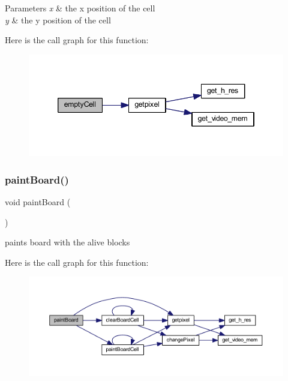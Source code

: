 \begin{DoxyParams}{Parameters}
{\em x} & the x position of the cell \\
\hline
{\em y} & the y position of the cell \\
\hline
\end{DoxyParams}
Here is the call graph for this function\+:
\nopagebreak
\begin{figure}[H]
\begin{center}
\leavevmode
\includegraphics[width=346pt]{group__board_gac7217ffded731ca5e0785e35b36c0191_cgraph}
\end{center}
\end{figure}
\mbox{\label{group__board_ga7f29585bdde7d843e71f9f2c80c8543a}} 
\subsubsection{\texorpdfstring{paintBoard()}{paintBoard()}}
{\footnotesize\ttfamily void paint\+Board (\begin{DoxyParamCaption}{ }\end{DoxyParamCaption})}



paints board with the alive blocks 

Here is the call graph for this function\+:
\nopagebreak
\begin{figure}[H]
\begin{center}
\leavevmode
\includegraphics[width=350pt]{group__board_ga7f29585bdde7d843e71f9f2c80c8543a_cgraph}
\end{center}
\end{figure}
\mbox{\label{group__board_gaca3eaa2f0cd1abf2f8cb0e6d80f0048f}} 

